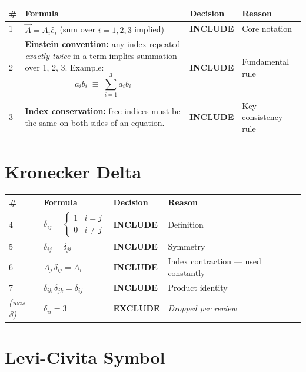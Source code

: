 \documentclass[11pt,a4paper]{article}
\newcommand{\inc}{\textbf{\textcolor{incgreen}{INCLUDE}}}
\newcommand{\exc}{\textbf{\textcolor{exred}{EXCLUDE}}}
\begin{document}
\begin{longtable}{p{0.5cm} p{7.5cm} p{2.2cm} p{3.5cm}}
\toprule
\# & Formula & Decision & Reason \\
\midrule
\endhead
1 & $\vec{A} = A_i\hat{e}_i$ \quad (sum over $i=1,2,3$ implied) & \inc & Core notation \\[10pt]
2 & \textbf{Einstein convention:} any index repeated \emph{exactly twice} in a term implies summation over 1, 2, 3. Example:
\[a_i b_i \;\equiv\; \sum_{i=1}^{3} a_i b_i\]
& \inc & Fundamental rule \\[14pt]
3 & \textbf{Index conservation:} free indices must be the same on both sides of an equation. & \inc & Key consistency rule \\[6pt]
\bottomrule
\end{longtable}

\section{Kronecker Delta}

\begin{longtable}{p{0.5cm} p{7.5cm} p{2.2cm} p{3.5cm}}
\toprule
\# & Formula & Decision & Reason \\
\midrule
\endhead
4 & $\displaystyle\delta_{ij} = \begin{cases} 1 & i = j \\ 0 & i \neq j \end{cases}$ & \inc & Definition \\[18pt]
5 & $\delta_{ij} = \delta_{ji}$ & \inc & Symmetry \\[10pt]
6 & $A_j\,\delta_{ij} = A_i$ & \inc & Index contraction --- used constantly \\[10pt]
7 & $\delta_{ik}\,\delta_{jk} = \delta_{ij}$ & \inc & Product identity \\[10pt]
\textit{(was 8)} & $\delta_{ii} = 3$ & \exc & \textit{Dropped per review} \\[6pt]
\bottomrule
\end{longtable}

\section{Levi-Civita Symbol}
\end{document}
